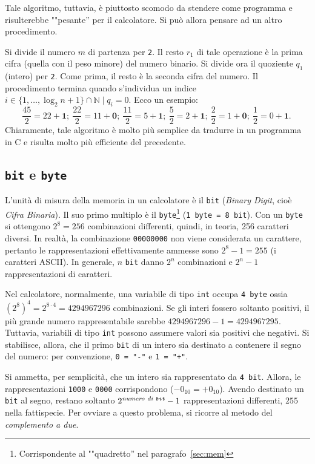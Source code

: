 Tale algoritmo, tuttavia, è piuttosto scomodo da stendere come programma e risulterebbe ""pesante'' per il calcolatore. Si può allora pensare ad un altro procedimento.

Si divide il numero $m$ di partenza per \lstinline!2!. Il resto $r_1$ di tale operazione è la prima cifra (quella con il peso minore) del numero binario. Si divide ora il quoziente $q_1$ (intero) per \lstinline!2!. Come prima,  il resto è la seconda cifra del numero. Il procedimento termina quando s'individua un indice $i\in\{1,\dots,\log_2n+1\}\cap\mathbb{N} \mid q_{i}=0$. Ecco un esempio:
\[
\dfrac{45}{2}=22+\mathbf{1};\ 
\dfrac{22}{2}=11+\mathbf{0};\ 
\dfrac{11}{2}=5+\mathbf{1};\ 
\dfrac{5}{2}=2+\mathbf{1};\ 
\dfrac{2}{2}=1+\mathbf{0};\ 
\dfrac{1}{2}=0+\mathbf{1}.\ 
\]
Chiaramente, tale algoritmo è molto più semplice da tradurre in un programma in C e risulta molto più efficiente del precedente.

	\subsection{\lstinline!bit! e \lstinline!byte!}
L'unità di misura della memoria in un calcolatore è il \lstinline!bit! (\emph{Binary Digit}, cioè \emph{Cifra Binaria}). Il suo primo multiplo è il \lstinline!byte!\footnote{Corrispondente al ""quadretto'' nel paragrafo~\vref{sec:mem}} (\lstinline!1 byte = 8 bit!). Con un \lstinline!byte! si ottengono $2^8=256$ combinazioni differenti, quindi, in teoria, 256 caratteri diversi. In realtà, la combinazione \lstinline!00000000! non viene considerata un carattere, pertanto le rappresentazioni effettivamente ammesse sono $2^8-1=255$ (i caratteri ASCII). In generale, $n$ \lstinline!bit! danno $2^n$ combinazioni e $2^n-1$ rappresentazioni di caratteri.

Nel calcolatore, normalmente, una variabile di tipo \lstinline!int! occupa \lstinline!4 byte! ossia $(2^8)^4=2^{8\cdot4}=4294967296$ combinazioni. Se gli interi fossero soltanto positivi, il più grande numero rappresentabile sarebbe $4294967296-1=4294967295$. Tuttavia, variabili di tipo \lstinline!int! possono assumere valori sia positivi che negativi. Si stabilisce, allora, che il primo \lstinline!bit! di un intero sia destinato a contenere il segno del numero: per convenzione, \lstinline!0 = "-"! e \lstinline!1 = "+"!.

Si ammetta, per semplicità, che un intero sia rappresentato da \lstinline!4 bit!. Allora, le rappresentazioni \lstinline!1000! e \lstinline!0000! corrispondono ($-0_{10}=+0_{10}$). Avendo destinato un \lstinline!bit! al segno, restano soltanto $2^{\text{\em numero di \texttt{bit}}}-1$ rappresentazioni differenti, $255$ nella fattispecie. Per ovviare a questo problema, si ricorre al metodo del \emph{complemento a due}.

